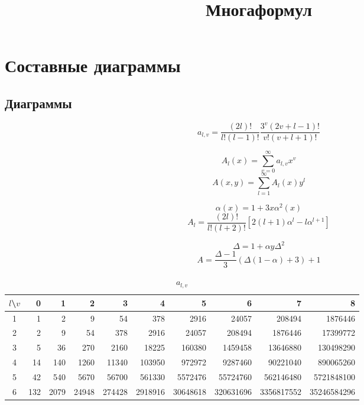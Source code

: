 \documentclass[12pt]{article}
\begin{document}
\title{Многаформул}
\maketitle

\section{Составные диаграммы}
\subsection{Диаграммы}

\begin{equation}
a_{l,v} = \frac{(2 l)!}{l! (l - 1)!} \frac{3^v (2 v + l - 1)!}{v! (v + l + 1)!}
\end{equation}

\begin{equation}
A_l(x) = \sum_{v = 0}^{\infty} a_{l,v} x^v
\end{equation}
\begin{equation}
A(x, y) = \sum_{l = 1}^{\infty} A_l(x) y^l
\end{equation}

\begin{equation}
\alpha(x) = 1 + 3 x \alpha^2(x)
\end{equation}
\begin{equation}
A_l = \frac{(2 l)!}{l! (l + 2)!} \left[ 2 (l + 1) \alpha^l - l \alpha^{l + 1} \right]
\end{equation}

\begin{equation}
\Delta = 1 + \alpha y \Delta^2
\end{equation}
\begin{equation}
A = \frac{\Delta - 1}{3} \left( \Delta (1 - \alpha) + 3 \right) + 1
\end{equation}

\begin{table}[H!]
	\center
	\caption{$a_{l,v}$}
	\begin{tabular}{|c||r|r|r|r|r|r|r|r|r|}
	\hline
	$l$\textbackslash $v$
	  &   0 &    1 &     2 &      3 &       4 &        5 &         6 &          7 &           8 \\
	\hline\hline
	1 &   1 &    2 &     9 &     54 &     378 &     2916 &     24057 &     208494 &     1876446 \\
	2 &   2 &    9 &    54 &    378 &    2916 &    24057 &    208494 &    1876446 &    17399772 \\
	3 &   5 &   36 &   270 &   2160 &   18225 &   160380 &   1459458 &   13646880 &   130498290 \\
	4 &  14 &  140 &  1260 &  11340 &  103950 &   972972 &   9287460 &   90221040 &   890065260 \\
	5 &  42 &  540 &  5670 &  56700 &  561330 &  5572476 &  55724760 &  562146480 &  5721848100 \\
	6 & 132 & 2079 & 24948 & 274428 & 2918916 & 30648618 & 320631696 & 3356817552 & 35246584296 \\
	\hline
	\end{tabular}
\end{table}
\end{document}
